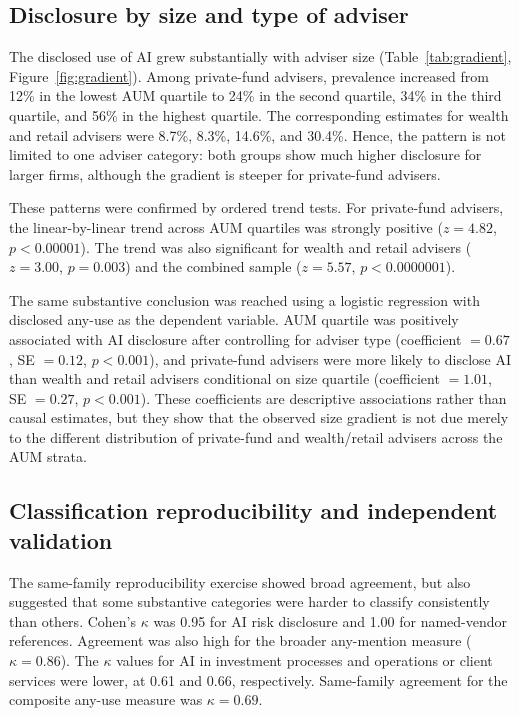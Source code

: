 \documentclass[utf8]{FrontiersinHarvard}
\begin{document}
\subsection{Disclosure by size and type of adviser}

The disclosed use of AI grew substantially with adviser size (Table~\ref{tab:gradient}, Figure~\ref{fig:gradient}). Among private-fund advisers, prevalence increased from 12\% in the lowest AUM quartile to 24\% in the second quartile, 34\% in the third quartile, and 56\% in the highest quartile. The corresponding estimates for wealth and retail advisers were 8.7\%, 8.3\%, 14.6\%, and 30.4\%. Hence, the pattern is not limited to one adviser category: both groups show much higher disclosure for larger firms, although the gradient is steeper for private-fund advisers.

These patterns were confirmed by ordered trend tests. For private-fund advisers, the linear-by-linear trend across AUM quartiles was strongly positive ($z = 4.82$, $p < 0.00001$). The trend was also significant for wealth and retail advisers ($z = 3.00$, $p = 0.003$) and the combined sample ($z = 5.57$, $p < 0.0000001$).

The same substantive conclusion was reached using a logistic regression with disclosed any-use as the dependent variable. AUM quartile was positively associated with AI disclosure after controlling for adviser type (coefficient $= 0.67$, SE $= 0.12$, $p < 0.001$), and private-fund advisers were more likely to disclose AI than wealth and retail advisers conditional on size quartile (coefficient $= 1.01$, SE $= 0.27$, $p < 0.001$). These coefficients are descriptive associations rather than causal estimates, but they show that the observed size gradient is not due merely to the different distribution of private-fund and wealth/retail advisers across the AUM strata.

\subsection{Classification reproducibility and independent validation}

The same-family reproducibility exercise showed broad agreement, but also suggested that some substantive categories were harder to classify consistently than others. Cohen's $\kappa$ was 0.95 for AI risk disclosure and 1.00 for named-vendor references. Agreement was also high for the broader any-mention measure ($\kappa = 0.86$). The $\kappa$ values for AI in investment processes and operations or client services were lower, at 0.61 and 0.66, respectively. Same-family agreement for the composite any-use measure was $\kappa = 0.69$.
\end{document}
